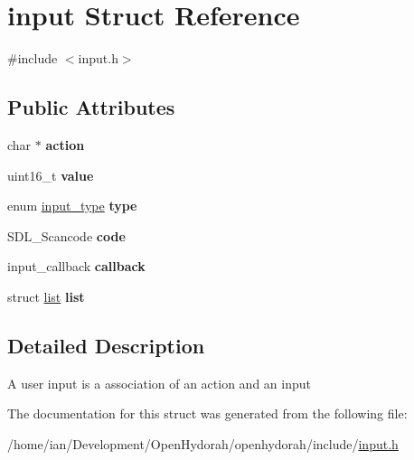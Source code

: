 \hypertarget{structinput}{\section{input Struct Reference}
\label{structinput}
}


{\ttfamily \#include $<$input.\-h$>$}

\subsection*{Public Attributes}
\begin{DoxyCompactItemize}
\item 
\hypertarget{structinput_aaa764f161a8e488c77b6caf34590d754}{char $\ast$ {\bfseries action}}\label{structinput_aaa764f161a8e488c77b6caf34590d754}

\item 
\hypertarget{structinput_aae7f764ce5af12f73c37291e6d089214}{uint16\-\_\-t {\bfseries value}}\label{structinput_aae7f764ce5af12f73c37291e6d089214}

\item 
\hypertarget{structinput_a3eb382530da03b730fcb35a8cf1c65ff}{enum \hyperlink{input_8h_a0ae208dfa21925e3cb4a7c4ea17ea8ef}{input\-\_\-type} {\bfseries type}}\label{structinput_a3eb382530da03b730fcb35a8cf1c65ff}

\item 
\hypertarget{structinput_a51f4be4a6b7f64269e9ad478c9993c44}{S\-D\-L\-\_\-\-Scancode {\bfseries code}}\label{structinput_a51f4be4a6b7f64269e9ad478c9993c44}

\item 
\hypertarget{structinput_a1e7afc0c0d60c3cbe97898df52560087}{input\-\_\-callback {\bfseries callback}}\label{structinput_a1e7afc0c0d60c3cbe97898df52560087}

\item 
\hypertarget{structinput_a2a6a19bf49148c46e91d580bdec824d7}{struct \hyperlink{structlist}{list} {\bfseries list}}\label{structinput_a2a6a19bf49148c46e91d580bdec824d7}

\end{DoxyCompactItemize}


\subsection{Detailed Description}
A user input is a association of an action and an input 

The documentation for this struct was generated from the following file\-:\begin{DoxyCompactItemize}
\item 
/home/ian/\-Development/\-Open\-Hydorah/openhydorah/include/\hyperlink{input_8h}{input.\-h}\end{DoxyCompactItemize}
